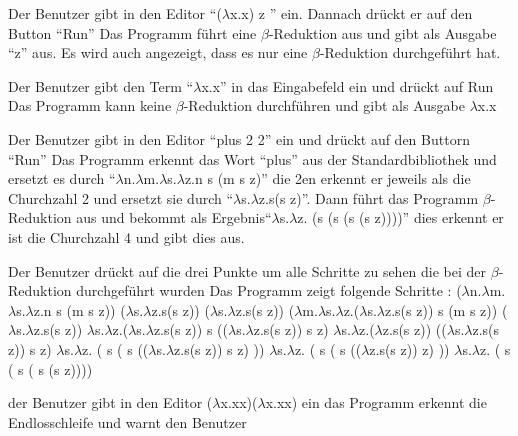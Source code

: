 \documentclass[parskip=full,11pt,twoside]{scrartcl}
\begin{document}
{ Der Benutzer gibt in den Editor \enquote {($\lambda$x.x) z } ein. Dannach drückt er auf den Button \enquote {Run}}
{ Das Programm führt eine $\beta$-Reduktion aus und gibt als Ausgabe \enquote {z} aus. Es wird auch angezeigt, dass es nur eine $\beta$-Reduktion durchgeführt hat.}

{Der Benutzer gibt den Term \enquote {$\lambda$x.x} in das Eingabefeld ein und drückt auf Run}
{Das Programm kann keine $\beta$-Reduktion durchführen und gibt als Ausgabe $\lambda$x.x}

{Der Benutzer gibt in den Editor \enquote {plus 2 2} ein und drückt auf den Buttorn \enquote {Run}}
{ Das Programm erkennt das Wort \enquote {plus} aus der Standardbibliothek und ersetzt es durch \enquote {$\lambda$n.$\lambda$m.$\lambda$s.$\lambda$z.n s (m s z)} die 2en erkennt er jeweils als die Churchzahl 2 und ersetzt sie durch \enquote {$\lambda$s.$\lambda$z.s(s z)}. Dann führt das Programm $\beta$-Reduktion aus und bekommt als Ergebnis\enquote {$\lambda$s.$\lambda$z. (s (s (s (s z))))} dies erkennt er ist die Churchzahl 4 und gibt dies aus. }

{ Der Benutzer drückt auf die drei Punkte um alle Schritte zu sehen die bei der $\beta$-Reduktion durchgeführt wurden }
{ Das Programm zeigt folgende Schritte :
\newline ($\lambda$n.$\lambda$m.$\lambda$s.$\lambda$z.n s (m s z)) ($\lambda$s.$\lambda$z.s(s z)) ($\lambda$s.$\lambda$z.s(s z))
\newline ($\lambda$m.$\lambda$s.$\lambda$z.($\lambda$s.$\lambda$z.s(s z)) s (m s z)) ($\lambda$s.$\lambda$z.s(s z))
\newline $\lambda$s.$\lambda$z.($\lambda$s.$\lambda$z.s(s z)) s (($\lambda$s.$\lambda$z.s(s z)) s z)
\newline $\lambda$s.$\lambda$z.($\lambda$z.s(s z)) (($\lambda$s.$\lambda$z.s(s z)) s z)
\newline $\lambda$s.$\lambda$z. ( s ( s (($\lambda$s.$\lambda$z.s(s z)) s z) ))
\newline $\lambda$s.$\lambda$z. ( s ( s (($\lambda$z.s(s z)) z) ))
\newline $\lambda$s.$\lambda$z. ( s ( s ( s (s z))))
 }

{der Benutzer gibt in den Editor ($\lambda$x.xx)($\lambda$x.xx) ein }
{ das Programm erkennt die Endlosschleife und warnt den Benutzer }
\end{document}
